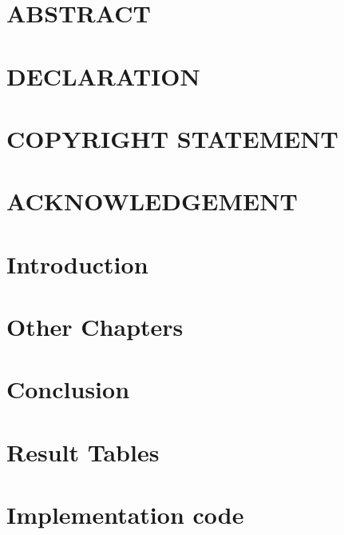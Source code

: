 \documentclass[12pt,a4paper]{report}
\begin{document}

\thispagestyle{empty}

\pagestyle{plain}
\setcounter{page}{1}

\tableofcontents
\listoffigures
\listoftables

\chapter*{ABSTRACT}


\chapter*{DECLARATION}


\chapter*{COPYRIGHT STATEMENT}


\chapter*{ACKNOWLEDGEMENT}


\chapter{Introduction\label{chap:introduction}}


\chapter{Other Chapters\label{chap:other}}


\chapter{Conclusion\label{chap:conclusion}}


\thispagestyle{empty}\newpage

\appendix
\chapter{Result Tables}
\label{chap:resulttables}

\chapter{Implementation code}
\label{chap:implementationcode}


\clearpage
{}

\end{document}
